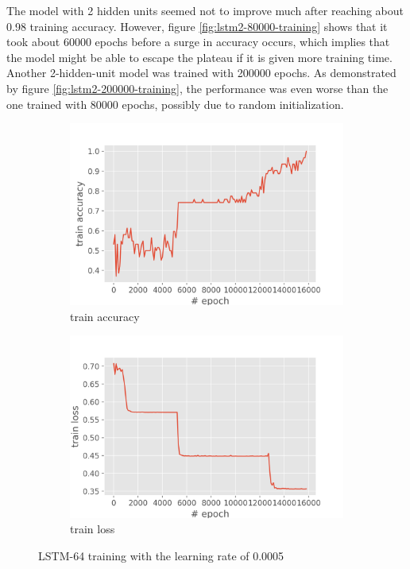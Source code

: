 \documentclass[12pt,article]{article}
\begin{document}
The model with 2 hidden units seemed not to improve much after reaching about 0.98 training accuracy. However, figure \ref{fig:lstm2-80000-training} shows that it took about 60000 epochs before a surge in accuracy occurs, which implies that the model might be able to escape the plateau if it is given more training time. Another 2-hidden-unit model was trained with 200000 epochs. As demonstrated by figure \ref{fig:lstm2-200000-training}, the performance was even worse than the one trained with 80000 epochs, possibly due to random initialization.

\begin{figure}[H]
\centering
\begin{subfigure}{.5\textwidth}
    \centering
    \includegraphics[scale=0.6]{LSTM-64_parity_train_accuracy.png} \par
    \caption{train accuracy}
\end{subfigure}%
\begin{subfigure}{.5\textwidth}
    \centering
    \includegraphics[scale=0.6]{LSTM-64_parity_train_loss.png} \par
    \caption{train loss}
\end{subfigure}
\caption{LSTM-64 training with the learning rate of 0.0005}
\label{fig:lstm64-training}
\end{figure}
\end{document}
